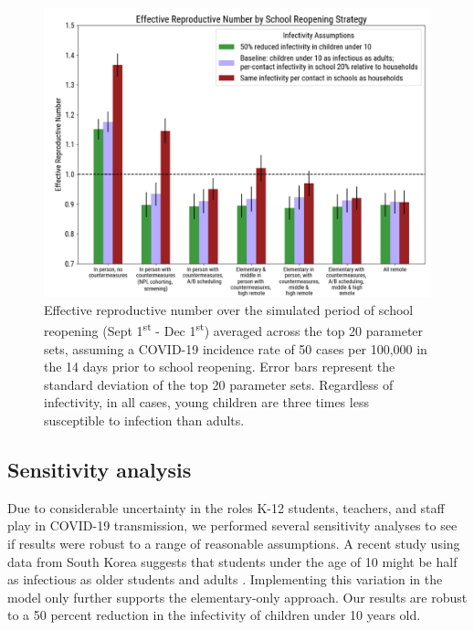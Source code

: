 \documentclass[preprint,12pt]{elsarticle}
\begin{document}
\begin{figure}
    \centering
    \includegraphics[scale=0.25]{reff.png}
    \caption{Effective reproductive number over the simulated period of school reopening (Sept 1\textsuperscript{st} - Dec 1\textsuperscript{st}) averaged across the top 20 parameter sets, assuming a COVID-19 incidence rate of 50 cases per 100,000 in the 14 days prior to school reopening. Error bars represent the standard deviation of the top 20 parameter sets. Regardless of infectivity, in all cases, young children are three times less susceptible to infection than adults.}
    \label{fig:reff}
\end{figure}

\subsection{Sensitivity analysis}

Due to considerable uncertainty in the roles K-12 students, teachers, and staff play in COVID-19 transmission, we performed several sensitivity analyses to see if results were robust to a range of reasonable assumptions. A recent study using data from South Korea suggests that students under the age of 10 might be half as infectious as older students and adults \cite{park_early_nodate}. Implementing this variation in the model only further supports the elementary-only approach. Our results are robust to a 50 percent reduction in the infectivity of children under 10 years old.
\end{document}
